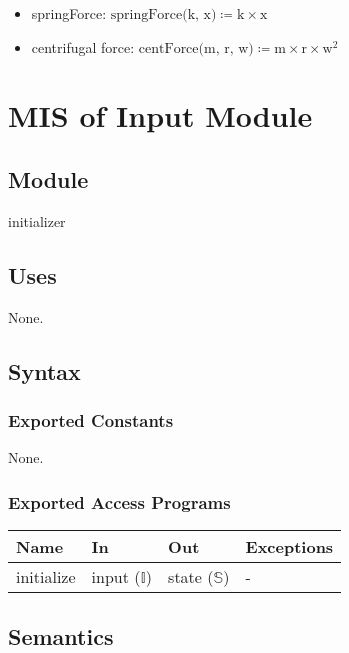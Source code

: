 \documentclass[12pt, titlepage]{article}
\begin{document}
\begin{itemize}
  \item springForce: $\text{springForce(k, x)} \coloneq \text{k} \times \text{x}$
  \item centrifugal force: $\text{centForce(m, r, w)} \coloneq \text{m} \times \text{r} \times \text{w}^2$
\end{itemize}
\newpage

\section{MIS of Input Module} \label{Module_input}

\subsection{Module}

initializer

\subsection{Uses}

None.

\subsection{Syntax}

\subsubsection{Exported Constants}
None.

\subsubsection{Exported Access Programs}

\begin{center}
\begin{tabular}{p{2cm} p{4cm} p{4cm} p{2cm}}
\hline
\textbf{Name} & \textbf{In} & \textbf{Out} & \textbf{Exceptions} \\
\hline
initialize & input ($\mathbb{I}$) & state ($\mathbb{S}$) & - \\
\hline
\end{tabular}
\end{center}

\subsection{Semantics}
\end{document}
